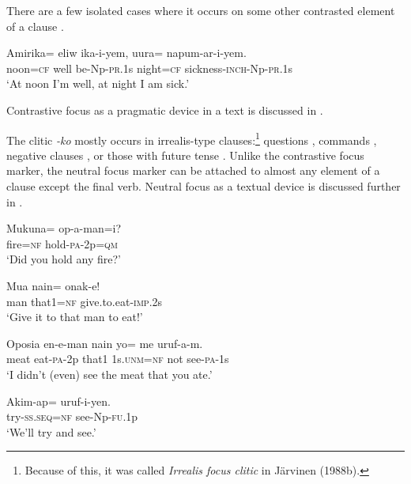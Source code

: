 There are a few isolated cases where it occurs on some other contrasted element of a clause .

\ea%
\label{ex:3:x784}
\gll Amirika= eliw ika-i-yem, uura= napum-ar-i-yem. \\
noon=\textsc{cf} well be-Np-\textsc{pr}.1s night=\textsc{cf} sickness-\textsc{inch}-Np-\textsc{pr}.1s\\
\glt`At noon I'm well, at night I am sick.'
\z

\noindent Contrastive focus as a pragmatic device in a text is discussed in .

The  clitic \textit{-ko} mostly occurs in irrealis-type clauses:\footnote{Because of this, it was called \textit{Irrealis focus clitic} in J\"arvinen (1988b).} questions , commands , negative clauses , or those with future tense . Unlike the contrastive focus marker, the neutral focus marker can be attached to almost any element of a clause except the final verb. Neutral focus as a textual device is discussed further in .

\ea%
\label{ex:3:x785}
\gll Mukuna= op-a-man=i? \\
fire=\textsc{nf} hold-\textsc{pa}-2p=\textsc{qm}\\
\glt`Did you hold any fire?'
\z

\ea%
\label{ex:3:x786}
\gll Mua nain= onak-e! \\
man that1=\textsc{nf} give.to.eat-\textsc{imp}.2s\\
\glt`Give it to that man to eat!'
\z

\ea%
\label{ex:3:x787}
\gll Oposia en-e-man nain yo= me uruf-a-m. \\
meat eat-\textsc{pa}-2p that1 1s.\textsc{unm}=\textsc{nf} not see-\textsc{pa}-1s\\
\glt`I didn't (even) see the meat that you ate.'
\z

\ea%
\label{ex:3:x788}
\gll Akim-ap= uruf-i-yen. \\
try-\textsc{ss}.\textsc{seq}=\textsc{nf} see-Np-\textsc{fu}.1p\\
\glt`We'll try and see.'
\z

